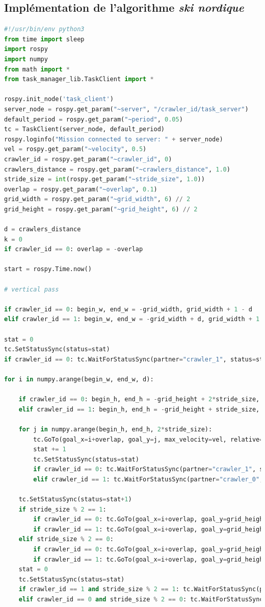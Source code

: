 \documentclass[francais,RandD]{rapportPFE}
\begin{document}
		\subsection{Implémentation de l'algorithme \textit{ski nordique}}
			\begin{lstlisting}[language=Python,caption={Implémentation de l'algorithme de ski nordique},label=lst:ski_nordique]
#!/usr/bin/env python3
from time import sleep
import rospy
import numpy
from math import *
from task_manager_lib.TaskClient import *

rospy.init_node('task_client')
server_node = rospy.get_param("~server", "/crawler_id/task_server")
default_period = rospy.get_param("~period", 0.05)
tc = TaskClient(server_node, default_period)
rospy.loginfo("Mission connected to server: " + server_node)
vel = rospy.get_param("~velocity", 0.5)
crawler_id = rospy.get_param("~crawler_id", 0)
crawlers_distance = rospy.get_param("~crawlers_distance", 1.0)
stride_size = int(rospy.get_param("~stride_size", 1.0))
overlap = rospy.get_param("~overlap", 0.1)
grid_width = rospy.get_param("~grid_width", 6) // 2
grid_height = rospy.get_param("~grid_height", 6) // 2

d = crawlers_distance
k = 0
if crawler_id == 0: overlap = -overlap

start = rospy.Time.now()

# vertical pass

if crawler_id == 0: begin_w, end_w = -grid_width, grid_width + 1 - d
elif crawler_id == 1: begin_w, end_w = -grid_width + d, grid_width + 1

stat = 0
tc.SetStatusSync(status=stat)
if crawler_id == 0: tc.WaitForStatusSync(partner="crawler_1", status=stat+1)

for i in numpy.arange(begin_w, end_w, d):

	if crawler_id == 0: begin_h, end_h = -grid_height + 2*stride_size, grid_height + 1 + stride_size
	elif crawler_id == 1: begin_h, end_h = -grid_height + stride_size, grid_height + 1 + stride_size

	for j in numpy.arange(begin_h, end_h, 2*stride_size):
		tc.GoTo(goal_x=i+overlap, goal_y=j, max_velocity=vel, relative=False)
		stat += 1
		tc.SetStatusSync(status=stat)
		if crawler_id == 0: tc.WaitForStatusSync(partner="crawler_1", status=stat+1)
		elif crawler_id == 1: tc.WaitForStatusSync(partner="crawler_0", status=stat)

	tc.SetStatusSync(status=stat+1)
	if stride_size % 2 == 1:
		if crawler_id == 0: tc.GoTo(goal_x=i+overlap, goal_y=grid_height + stride_size, max_velocity=vel, relative=False)
		if crawler_id == 1: tc.GoTo(goal_x=i+overlap, goal_y=grid_height, max_velocity=vel, relative=False)
	elif stride_size % 2 == 0:
		if crawler_id == 0: tc.GoTo(goal_x=i+overlap, goal_y=grid_height, max_velocity=vel, relative=False)
		if crawler_id == 1: tc.GoTo(goal_x=i+overlap, goal_y=grid_height + stride_size, max_velocity=vel, relative=False)
	stat = 0
	tc.SetStatusSync(status=stat)
	if crawler_id == 1 and stride_size % 2 == 1: tc.WaitForStatusSync(partner="crawler_0", status=stat+1)
	elif crawler_id == 0 and stride_size % 2 == 0: tc.WaitForStatusSync(partner="crawler_1", status=stat+1)


\end{lstlisting}
\end{document}
